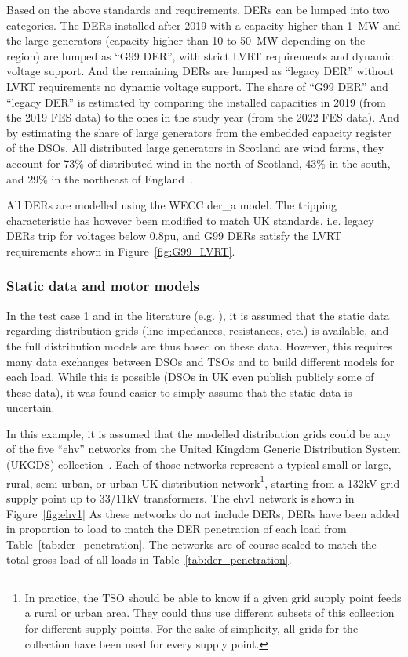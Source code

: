 Based on the above standards and requirements, DERs can be lumped into two categories. The DERs installed after 2019 with a capacity higher than 1~MW and the large generators (capacity higher than 10 to 50~MW depending on the region) are lumped as ``G99 DER'', with strict LVRT requirements and dynamic voltage support. And the remaining DERs are lumped as ``legacy DER'' without LVRT requirements no dynamic voltage support. The share of ``G99 DER'' and ``legacy DER'' is estimated by comparing the installed capacities in 2019 (from the 2019 FES data) to the ones in the study year (from the 2022 FES data). And by estimating the share of large generators from the embedded capacity register of the DSOs. All distributed large generators in Scotland are wind farms, they account for 73\% of distributed wind in the north of Scotland, 43\% in the south, and 29\% in the northeast of England~\cite{capacity_register_northern_powergrid, capacity_register_ssen, capacity_register_sp}.

All DERs are modelled using the WECC der\_a model. The tripping characteristic has however been modified to match UK standards, i.e. legacy DERs trip for voltages below 0.8pu, and G99 DERs satisfy the LVRT requirements shown in Figure~\ref{fig:G99_LVRT}.

\subsubsection{Static data and motor models}
\label{sec:CIGRE_distrib_static}

In the test case 1 and in the literature (e.g. \cite{ChaspierrePaper, ChaspierreThesis, Vorwerk}), it is assumed that the static data regarding distribution grids (line impedances, resistances, etc.) is available, and the full distribution models are thus based on these data. However, this requires many data exchanges between DSOs and TSOs and to build different models for each load. While this is possible (DSOs in UK even publish publicly some of these data), it was found easier to simply assume that the static data is uncertain.

In this example, it is assumed that the modelled distribution grids could be any of the five ``ehv'' networks from the United Kingdom Generic Distribution System (UKGDS) collection~\cite{UKGDS}. Each of those networks represent a typical small or large, rural, semi-urban, or urban UK distribution network\footnote{In practice, the TSO should be able to know if a given grid supply point feeds a rural or urban area. They could thus use different subsets of this collection for different supply points. For the sake of simplicity, all grids for the collection have been used for every supply point.}, starting from a 132kV grid supply point up to 33/11kV transformers. The ehv1 network is shown in Figure~\ref{fig:ehv1} As these networks do not include DERs, DERs have been added in proportion to load to match the DER penetration of each load from Table~\ref{tab:der_penetration}. The networks are of course scaled to match the total gross load of all loads in Table~\ref{tab:der_penetration}.

